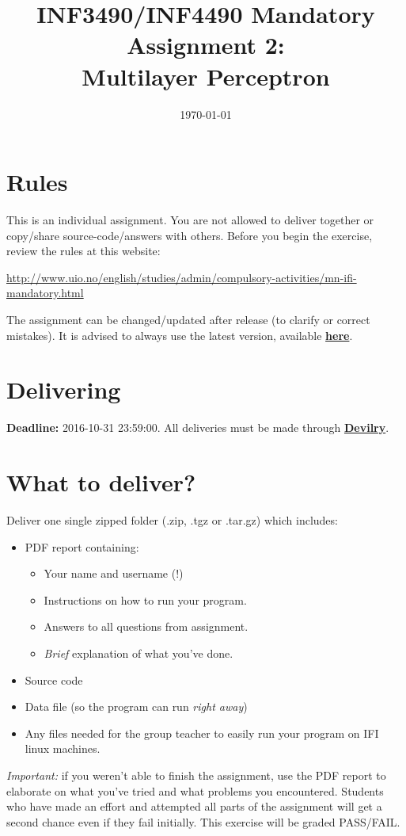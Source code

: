 \documentclass{article}           %
\title{\vspace{-2cm}INF3490/INF4490 Mandatory Assignment 2:\\
Multilayer Perceptron}
\date{\today}
\newcommand\marginsymbol[1][0pt]{%
\tabto*{0cm}\makebox[\dimexpr-1cm-#1\relax][r]{$\mathbb{P}$}\tabto*{\TabPrevPos}}
\begin{document}
    \renewcommand\marginsymbol[1][0pt]{%
  \tabto*{0cm}\makebox[-1cm][c]{$\mathbb{P}$}\tabto*{\TabPrevPos}}

\maketitle
\section*{Rules}
This is an individual assignment.
You are not allowed to deliver together or copy/share source-code/answers with others.
Before you begin the exercise, review the rules at this website:
\begin{center}
\url{http://www.uio.no/english/studies/admin/compulsory-activities/mn-ifi-mandatory.html}
\end{center}


The assignment can be changed/updated after release (to clarify or correct mistakes).
It is advised to always use the latest version, available
 \href{http://www.uio.no/studier/emner/matnat/ifi/INF3490/h16/assignment-2/inf3490-as2.pdf}{\textbf{here}}.

\section*{Delivering}
\textbf{Deadline:} 2016-10-31 23:59:00. All deliveries must be made through
\href{https://devilry.ifi.uio.no}{\textbf{Devilry}}.
\section*{What to deliver?}
Deliver one single zipped folder (.zip, .tgz or .tar.gz) which includes:
\begin{itemize}
    \item PDF report containing:
    \begin{itemize}
        \item Your name and username (!)
        \item Instructions on how to run your program.
        \item Answers to all questions from assignment.
        \item \emph{Brief} explanation of what you've done.
    \end{itemize}
    \item Source code
    \item Data file (so the program can run \emph{right away})
    \item Any files needed for the group teacher to easily run your program on
          IFI linux machines.
\end{itemize}
\emph{Important: } if you weren't able to finish the assignment, use the PDF
report to elaborate on what you've tried and what problems you encountered.
Students who have made an effort and attempted all parts of the assignment
will get a second chance even if they fail initially. This exercise will be
graded PASS/FAIL.
\end{document}
